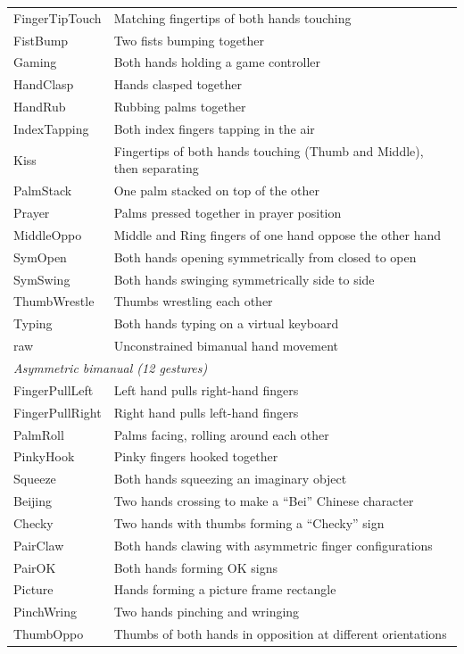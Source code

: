 \documentclass{article}
\begin{document}
\begin{table}[h]
\begin{tabular}{@{}lp{}@{}}
FingerTipTouch & Matching fingertips of both hands touching \\
FistBump & Two fists bumping together \\
Gaming & Both hands holding a game controller \\
HandClasp & Hands clasped together\\
HandRub & Rubbing palms together \\
IndexTapping & Both index fingers tapping in the air \\
Kiss & Fingertips of both hands touching (Thumb and Middle), then separating \\

PalmStack & One palm stacked on top of the other \\

Prayer & Palms pressed together in prayer position \\
MiddleOppo & Middle and Ring fingers of one hand oppose the other hand \\
SymOpen & Both hands opening symmetrically from closed to open \\
SymSwing & Both hands swinging symmetrically side to side \\
ThumbWrestle & Thumbs wrestling each other \\
Typing & Both hands typing on a virtual keyboard \\
raw & Unconstrained bimanual hand movement \\
\midrule
\multicolumn{2}{l}{\textit{Asymmetric bimanual (12 gestures)}} \\
\midrule
FingerPullLeft & Left hand pulls right-hand fingers \\
FingerPullRight & Right hand pulls left-hand fingers \\
PalmRoll & Palms facing, rolling around each other \\
PinkyHook & Pinky fingers hooked together \\
Squeeze & Both hands squeezing an imaginary object \\

Beijing & Two hands crossing to make a ``Bei'' Chinese character \\
Checky & Two hands with thumbs forming a ``Checky'' sign \\

PairClaw & Both hands clawing with asymmetric finger configurations \\
PairOK & Both hands forming OK signs \\
Picture & Hands forming a picture frame rectangle \\
PinchWring & Two hands pinching and wringing\\
ThumbOppo & Thumbs of both hands in opposition at different orientations \\
\bottomrule
\end{tabular}
\end{table}
\end{document}
